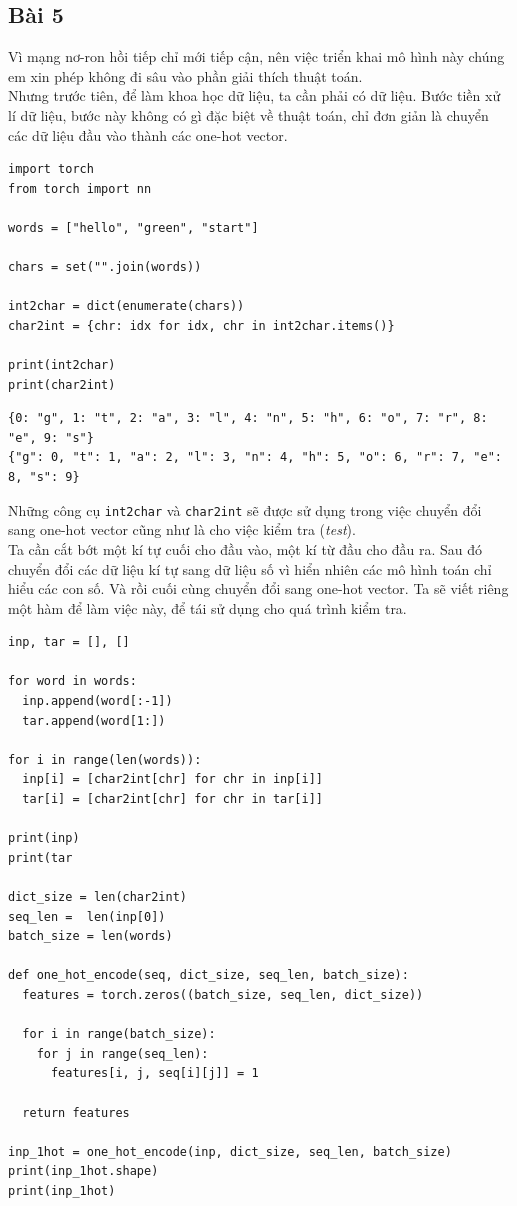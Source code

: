 \documentclass[a4paper]{article}
\begin{document}
\subsection{Bài 5}
Vì mạng nơ-ron hồi tiếp chỉ mới tiếp cận, nên việc triển khai mô hình này chúng em xin phép không đi sâu vào phần giải thích thuật toán.\\
Nhưng trước tiên, để làm khoa học dữ liệu, ta cần phải có dữ liệu. Bước tiền xử lí dữ liệu, bước này không có gì đặc biệt về thuật toán, chỉ đơn giản là chuyển các dữ liệu đầu vào thành các one-hot vector.
\begin{lstlisting}
import torch
from torch import nn

words = ["hello", "green", "start"]

chars = set("".join(words))

int2char = dict(enumerate(chars))
char2int = {chr: idx for idx, chr in int2char.items()}

print(int2char)
print(char2int)
\end{lstlisting}
\begin{verbatim}
{0: "g", 1: "t", 2: "a", 3: "l", 4: "n", 5: "h", 6: "o", 7: "r", 8: "e", 9: "s"}
{"g": 0, "t": 1, "a": 2, "l": 3, "n": 4, "h": 5, "o": 6, "r": 7, "e": 8, "s": 9}
\end{verbatim}
Những công cụ \texttt{int2char} và \texttt{char2int} sẽ được sử dụng trong việc chuyển đổi sang one-hot vector cũng như là cho việc kiểm tra (\textit{test}).\\
Ta cần cắt bớt một kí tự cuối cho đầu vào, một kí từ đầu cho đầu ra. Sau đó chuyển đổi các dữ liệu kí tự sang dữ liệu số vì hiển nhiên các mô hình toán chỉ hiểu các con số. Và rồi cuối cùng chuyển đổi sang one-hot vector. Ta sẽ viết riêng một hàm để làm việc này, để tái sử dụng cho quá trình kiểm tra.
\begin{lstlisting}
inp, tar = [], []

for word in words:
  inp.append(word[:-1])
  tar.append(word[1:])

for i in range(len(words)):
  inp[i] = [char2int[chr] for chr in inp[i]]
  tar[i] = [char2int[chr] for chr in tar[i]]

print(inp)
print(tar

dict_size = len(char2int)
seq_len =  len(inp[0])
batch_size = len(words)

def one_hot_encode(seq, dict_size, seq_len, batch_size):
  features = torch.zeros((batch_size, seq_len, dict_size))

  for i in range(batch_size):
    for j in range(seq_len):
      features[i, j, seq[i][j]] = 1

  return features
  
inp_1hot = one_hot_encode(inp, dict_size, seq_len, batch_size)
print(inp_1hot.shape)
print(inp_1hot)
\end{lstlisting}
\end{document}
